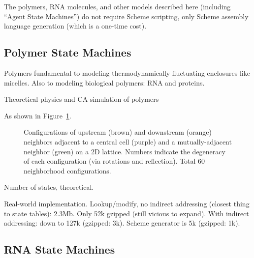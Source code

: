 \documentclass{acm_proc_article-sp}
\begin{document}
The polymers, RNA molecules, and other models described here (including ``Agent State Machines'') do not require Scheme scripting, only Scheme assembly language generation (which is a one-time cost).

\subsection{Polymer State Machines}

Polymers fundamental to modeling thermodynamically fluctuating enclosures like micelles.
Also to modeling biological polymers: RNA and proteins.

Theoretical physics \cite{DoiEdwards1988} and CA simulation of polymers \cite{PhysRevLett.64.1915,journals/pc/OstrovskyCSB01}

As shown in Figure~\ref{fig:polymer}.

\begin{figure}
\caption{
\label{fig:polymer}
Configurations of upstream (brown) and downstream (orange) neighbors adjacent to a central cell (purple) and a mutually-adjacent neighbor (green) on a 2D lattice.
Numbers indicate the degeneracy of each configuration (via rotations and reflection).
Total 60 neighborhood configurations.
}
\end{figure}

Number of states, theoretical.

Real-world implementation.
Lookup/modify, no indirect addressing (closest thing to state tables): 2.3Mb.
Only 52k gzipped (still vicious to expand).
With indirect addressing: down to 127k (gzipped: 3k).
Scheme generator is 5k (gzipped: 1k).


\subsection{RNA State Machines}
\end{document}
